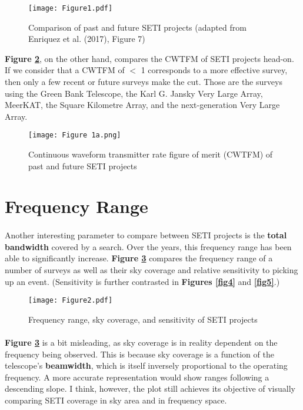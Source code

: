 \documentclass{article}
\begin{document}
\begin{figure}[H]
\begin{center}
\texttt{[image: Figure1.pdf]}
\caption{Comparison of past and future SETI projects (adapted from Enriquez et al. (2017), Figure 7) \textbf{\label{fig1}}}
\end{center}
\end{figure}

\textbf{Figure \ref{fig2}}, on the other hand, compares the CWTFM of SETI projects head-on. If we consider that a CWTFM of $<$ 1 corresponds to a more effective survey, then only a few recent or future surveys make the cut. Those are the surveys using the Green Bank Telescope, the Karl G. Jansky Very Large Array, MeerKAT, the Square Kilometre Array, and the next-generation Very Large Array.

\begin{figure}[H]
\begin{center}
\texttt{[image: Figure 1a.png]}
\caption{Continuous waveform transmitter rate figure of merit (CWTFM) of past and future SETI projects \textbf{\label{fig2}}}
\end{center}
\end{figure}


\section{Frequency Range}

\paragraph{}
Another interesting parameter to compare between SETI projects is the \textbf{total bandwidth} covered by a search. Over the years, this frequency range has been able to significantly increase. \textbf{Figure \ref{fig3}} compares the frequency range of a number of surveys as well as their sky coverage and relative sensitivity to picking up an event. (Sensitivity is further contrasted in \textbf{Figures \ref{fig4}} and \textbf{\ref{fig5}}.)

\begin{figure}[H]
\begin{center}
\texttt{[image: Figure2.pdf]}
\caption{Frequency range, sky coverage, and sensitivity of SETI projects \textbf{\label{fig3}}}
\end{center}
\end{figure}

\paragraph{}
\textbf{Figure \ref{fig3}} is a bit misleading, as sky coverage is in reality dependent on the frequency being observed. This is because sky coverage is a function of the telescope's \textbf{beamwidth}, which is itself inversely proportional to the operating frequency. A more accurate representation would show ranges following a descending slope. I think, however, the plot still achieves its objective of visually comparing SETI coverage in sky area and in frequency space.
\end{document}
